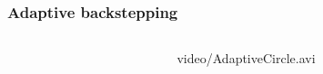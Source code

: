 \begin{frame}
\frametitle{Adaptive backstepping}
%
\begin{columns}
\begin{column}{0.4\textwidth}
\end{column}
\begin{column}{0.6\textwidth}
	\begin{center}
		{video/AdaptiveCircle.avi}
	\end{center}
\end{column}
\end{columns}
\end{frame}
%
